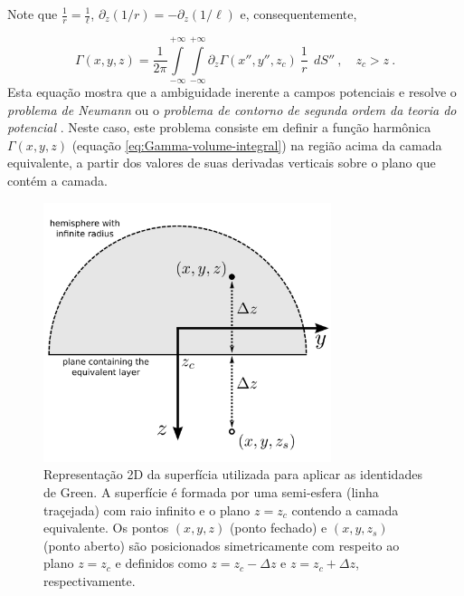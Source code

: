 Note que $\frac{1}{r} = \frac{1}{\ell}$, $\partial_{z} (1/r) = -\partial_{z} (1/\ell)$ e, consequentemente, 

\begin{equation}
\Gamma(x, y, z) = \frac{1}{2\pi}
\int\limits_{-\infty}^{+\infty}\int\limits_{-\infty}^{+\infty}
\partial_{z} \Gamma(x'', y'', z_{c}) \: \frac{1}{r} 
\:\: dS'' \: , \quad z_{c} > z \: .
\label{eq:Neumann_bvp}
\end{equation}
Esta equação mostra que a ambiguidade inerente a campos potenciais \citep{roy1962} e resolve o \textit{problema de Neumann} ou o \textit{problema de contorno de segunda ordem da teoria do potencial} \citep[][ p. 246]{kellogg1967}. Neste caso, este problema consiste em definir a função harmônica $\Gamma(x, y, z)$ (equação \ref{eq:Gamma-volume-integral}) na região acima da camada equivalente, a partir dos valores de suas derivadas verticais sobre o plano que contém a camada. 


\begin{figure}
	\centering
	\includegraphics[width=0.75\textwidth]{Fig/eqlayer/surface_Green.png}
	\caption{ Representação 2D da superfícia utilizada para aplicar as identidades de Green. A superfície é formada por uma semi-esfera (linha traçejada) com raio infinito e o plano $z = z_{c}$ contendo a camada equivalente. Os pontos $(x, y, z)$ (ponto fechado) e $(x, y, z_{s})$ (ponto aberto) são posicionados simetricamente com respeito ao plano $z = z_{c}$ e definidos como $z = z_{c} - \Delta z$ e $z = z_{c} + \Delta z$, respectivamente.}
	\label{fig:surface_Green}
\end{figure}